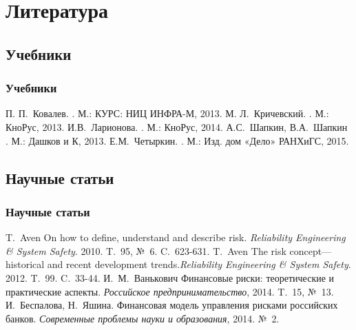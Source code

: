 \documentclass[financial_risks_lectures.tex]{subfiles}
\begin{document}
\section*{Литература}
\subsection*{Учебники}

\begin{frame}[shrink=15]
  \frametitle<presentation>{Учебники}
    
  \begin{thebibliography}{10}
    
  \beamertemplatebookbibitems

	П. П.~Ковалев. 
    .
    \newblock М.: КУРС: НИЦ ИНФРА-М, 2013.
	М. Л.~Кричевский. 
    .
    \newblock М.: КноРус, 2013.
	И.В.~Ларионова. 
    .
    \newblock М.: КноРус, 2014.
  \pagebreak
	А.С.~Шапкин, В.А.~Шапкин 
    .
    \newblock М.: Дашков и К, 2013. 
	Е.М.~Четыркин. 
    .
    \newblock М.: Изд. дом «Дело» РАНХиГС, 2015.
  
  \end{thebibliography}
\end{frame}

\subsection*{Научные статьи}

\begin{frame}[shrink=15]
  \frametitle<presentation>{Научные статьи}
  \begin{thebibliography}{10}
  \beamertemplatearticlebibitems
    \newblock T.~Aven 
    \newblock On how to define, understand and describe risk. {\em Reliability Engineering \& System Safety}. 2010. T.~95, №~6. C.~623-631.
    \newblock T.~Aven 
    \newblock The risk concept—historical and recent development trends.{\em Reliability Engineering \& System Safety}. 2012. T.~99. C.~33-44.
  	\newblock И.~М.~Ванькович
    \newblock Финансовые риски: теоретические и практические аспекты. {\em Российское предпринимательство}, 2014. T.~15, №~13.
    \newblock И.~Беспалова, Н.~Яшина.
	\newblock Финансовая модель управления рисками российских банков. {\em Современные проблемы науки и образования}, 2014. №~2.
  \end{thebibliography}
\end{frame}
\end{document}
